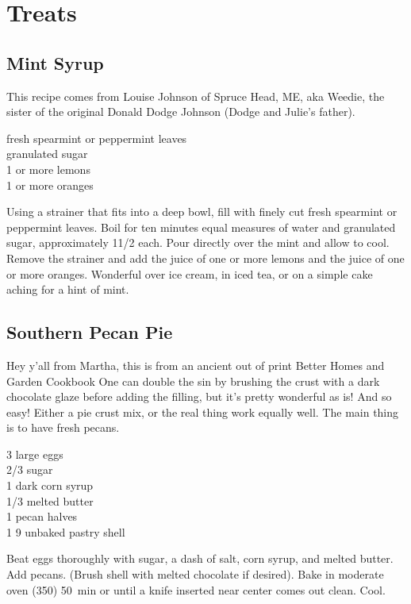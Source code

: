 \chapter{Treats}

\section{Mint Syrup}

\begin{open}
    This recipe comes from Louise Johnson of Spruce Head, ME, aka Weedie, the sister of the original Donald Dodge Johnson (Dodge and Julie’s father).
\end{open}
\begin{ingredients}
    fresh spearmint or peppermint leaves\\
    granulated sugar\\
    1 or more lemons\\
    1 or more oranges\\
\end{ingredients}
Using a strainer that fits into a deep bowl, fill with finely cut fresh spearmint or peppermint leaves. Boil for ten minutes equal measures of water and granulated sugar, approximately 1\SI{1/2}{\cup} each. Pour directly over the mint and allow to cool. Remove the strainer and add the juice of one or more lemons and the juice of one or more oranges. Wonderful over ice cream, in iced tea, or on a simple cake aching for a hint of mint.

\section{Southern Pecan Pie}

\begin{open}
    Hey y'all from Martha, this is from an ancient out of print Better Homes and
    Garden Cookbook One can double the sin by brushing the crust with a dark
    chocolate glaze before adding the filling, but it's pretty wonderful as is!
    And so easy! Either a pie crust mix, or the real thing work equally well.
    The main thing is to have fresh pecans.
\end{open}
\begin{ingredients}
    3 large eggs\\
    \SI{2/3}{\cup} sugar\\
    \SI{1}{\cup} dark corn syrup\\
    \SI{1/3}{\cup} melted butter\\
    \SI{1}{\cup} pecan halves\\
    1 \SI{9}{\inch} unbaked pastry shell\\
\end{ingredients}
Beat eggs thoroughly with sugar, a dash of salt, corn syrup, and melted butter.
Add pecans. (Brush shell with melted chocolate if desired). Bake in moderate
oven (\SI{350}{\degreeF}) \SI{50}{\minute} or until a knife inserted near center
comes out clean. Cool.

